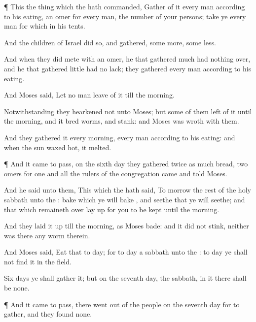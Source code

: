 {\par }{\PP {}¶ This
{} the
thing
which the
{} hath
commanded,
Gather of it every
man
according to his
eating, an
omer for every
man,
{} the
number of your
persons;
take ye every
man for
{} which
{} in his
tents.

And the
children of
Israel
did so, and
gathered, some
more, some
less.

And when they did
mete
{} with an
omer, he that gathered
much had nothing
over, and he that gathered
little had no
lack; they
gathered every
man
according to his
eating.

And
Moses
said, Let no
man
leave of it till the
morning.

Notwithstanding they
hearkened not unto
Moses; but
some of them
left of it until the
morning, and it
bred
worms, and
stank: and
Moses was
wroth with them.

And they
gathered it every
morning, every
man
according to his
eating: and when the
sun waxed
hot, it
melted.


\par }{\PP {}¶ And it came to pass,
{} on the
sixth
day they
gathered
twice as much
bread,
two
omers for
one
{} and all the
rulers of the
congregation
came and
told
Moses.

And he
said unto them, This
{} which the
{} hath
said, To
morrow
{} the
rest of the
holy
sabbath unto the
{}:
bake
{} which ye will
bake
{}, and
seethe that ye will
seethe; and that
which remaineth
over lay
up for you to be
kept until the
morning.

And they laid it
up till the
morning, as
Moses
bade: and it did not
stink, neither was there any
worm therein.

And
Moses
said,
Eat that to
day; for to
day
{} a
sabbath unto the
{}: to
day ye shall not
find it in the
field.

Six
days ye shall
gather it; but on the
seventh
day,
{} the
sabbath, in it there shall be none.


\par }{\PP {}¶ And it came to pass,
{} there went
out
{} of the
people on the
seventh
day for to
gather, and they
found none.

}
